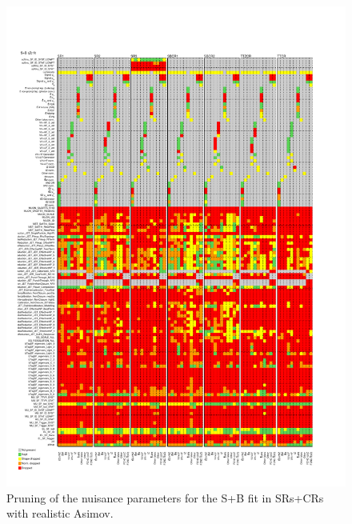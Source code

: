 \begin{figure}[htbp]
	\centering
	\includegraphics[width=.85\textwidth]{Appendices/AP8/figures/SPLUSB_CRSR_UsingSMTFullSys/Pruning}
	\caption{Pruning of the nuisance parameters for the S+B \tZc fit in SRs+CRs with realistic Asimov.}%
	\label{fig:stat_smt:tzc:splusb:crsr:pruning}
\end{figure}

